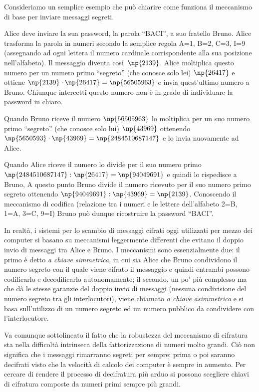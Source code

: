 Consideriamo un semplice esempio che può chiarire come funziona il meccanismo di base per inviare messaggi segreti.

Alice deve inviare la sua password, la parola ``BACI'', a suo fratello Bruno. Alice trasforma la parola in numeri secondo la semplice regola A=1, B=2, C=3, I=9 (assegnando ad ogni lettera il numero cardinale corrispondente alla sua posizione nell'alfabeto). Il messaggio diventa così~$ \np{2139} $. Alice moltiplica questo numero per un numero primo ``segreto'' (che conosce solo lei) $\np{26417}$ e ottiene $\np{2139} \cdot \np{26417}=\np{56505963}$ e invia quest'ultimo numero a Bruno. Chiunque intercetti questo numero non è in grado di individuare la password in chiaro.

Quando Bruno riceve il numero $ \np{56505963} $ lo moltiplica per un suo numero primo ``segreto'' (che conosce solo lui) $\np{43969}$ ottenendo $\np{5650593} \cdot \np{43969}=\np{2484510687147}$ e lo invia nuovamente ad Alice.

Quando Alice riceve il numero lo divide per il suo numero primo $\np{2484510687147} : \np{26417} = \np{94049691}$ e quindi lo rispedisce a Bruno,
A questo punto Bruno divide il numero ricevuto per il suo numero primo segreto ottenendo $\np{94049691} : \np{43969} = \np{2139}$. Conoscendo il meccanismo di codifica (relazione tra i numeri e le lettere dell'alfabeto  2=B, 1=A, 3=C, 9=I) Bruno può dunque ricostruire la password ``BACI''.

In realtà, i sistemi per lo scambio di messaggi cifrati oggi utilizzati per mezzo dei computer si basano su meccanismi leggermente differenti che evitano il doppio invio di messaggi tra Alice e Bruno. I meccanismi sono essenzialmente due: il primo è detto \emph{a chiave simmetrica}, in cui sia Alice che Bruno condividono il numero segreto con il quale viene cifrato il messaggio e quindi entrambi possono codificarlo e decodificarlo autonomamente; il secondo, un po' più complesso ma che dà le stesse garanzie del doppio invio di messaggi (nessuna condivisione del numero segreto tra gli interlocutori), viene chiamato \emph{a chiave asimmetrica} e si basa sull'utilizzo di un numero segreto ed un numero pubblico da condividere con l'interlocutore.

Va comunque sottolineato il fatto che la robustezza del meccanismo di cifratura sta nella difficoltà intrinseca della fattorizzazione di numeri molto grandi. Ciò non significa che i messaggi rimarranno segreti per sempre: prima o poi saranno decifrati visto che la velocità di calcolo dei computer è sempre in aumento. Per cercare di rendere il processo di decifratura più arduo si possono scegliere chiavi di cifratura composte da numeri primi sempre più grandi.


